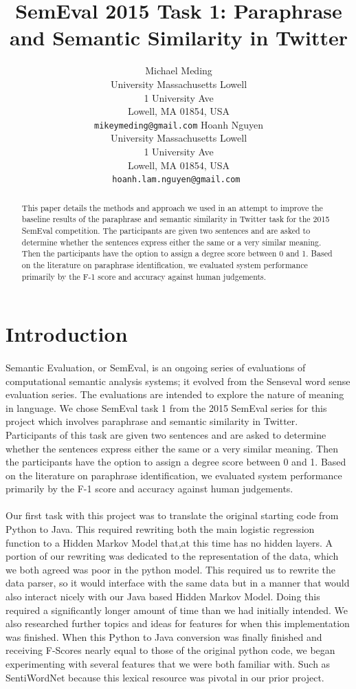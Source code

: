 \documentclass[11pt,letterpaper]{article}
\title{SemEval 2015 Task 1: Paraphrase and Semantic Similarity in Twitter}
\author{
	Michael Meding\\
  	University Massachusetts Lowell\\
	1 University Ave\\
	Lowell, MA 01854, USA\\
   {\tt mikeymeding@gmail.com}
	\And  
   Hoanh Nguyen\\
	University Massachusetts Lowell\\
	1 University Ave\\
	Lowell, MA 01854, USA\\
	{\tt hoanh.lam.nguyen@gmail.com }
}
\date{}
\begin{document}
\maketitle

\begin{abstract}
This paper details the methods and approach we used in an attempt to improve the baseline results of the paraphrase and semantic similarity in Twitter task for the 2015 SemEval competition. The participants are given two sentences and are asked to determine whether the sentences express either the same or a very similar meaning. Then the participants have the option to assign a degree score between 0 and 1. Based on the literature on paraphrase identification, we evaluated system performance primarily by the F-1 score and accuracy against human judgements. 
\end{abstract}

\section{Introduction}
\paragraph{} 
Semantic Evaluation, or SemEval, is an ongoing series of evaluations of computational semantic analysis systems; it evolved from the Senseval word sense evaluation series. The evaluations are intended to explore the nature of meaning in language. We chose SemEval task 1 from the 2015 SemEval series for this project which involves paraphrase and semantic similarity in Twitter. Participants of this task are given two sentences and are asked to determine whether the sentences express either the same or a very similar meaning. Then the participants have the option to assign a degree score between 0 and 1. Based on the literature on paraphrase identification, we evaluated system performance primarily by the F-1 score and accuracy against human judgements. 
\paragraph{}
Our first task with this project was to translate the original starting code from Python to Java. This required rewriting both the main logistic regression function to a Hidden Markov Model that,at this time has no hidden layers. A portion of our rewriting was dedicated to the representation of the data, which we both agreed was poor in the python model. This required us to rewrite the data parser, so it would interface with the same data but in a manner that would also interact nicely with our Java based Hidden Markov Model. Doing this required a significantly longer amount of time than we had initially intended. We also researched further topics and ideas for features for when this implementation was finished. When this Python to Java conversion was finally finished and receiving F-Scores nearly equal to those of the original python code, we began experimenting with several features that we were both familiar with. Such as SentiWordNet because this lexical resource was pivotal in our prior project.
\end{document}
